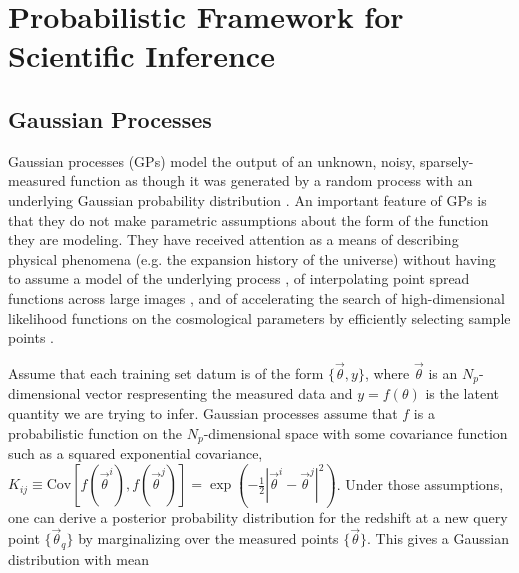 \documentclass[useAMS,usenatbib,tightenlines,11pt,preprint]{aastex}
\begin{document}


\section{Probabilistic Framework for Scientific Inference}

\subsection{Gaussian Processes}
\label{sec:gppz}

Gaussian processes (GPs) model the output of an unknown, noisy,
sparsely-measured
function as though it was generated by a random process with an underlying
Gaussian probability distribution \cite{gp}.
An important feature of GPs is that they do not make parametric assumptions
about the form of the function they are modeling.  They have received
attention as a means of describing physical phenomena (e.g. the expansion
history of the universe) without having to assume a model of the underlying
process \cite{ericgp}, of interpolating point spread functions across large
images \cite{psf}, and of accelerating the search of high-dimensional
likelihood functions on the cosmological parameters by efficiently
selecting sample points \cite{daniel2012}.  

Assume that each training set datum is of the form
$\{\vec{\theta},y\}$, where $\vec{\theta}$ is an $N_p$-dimensional vector
respresenting the measured data and $y = f(\theta)$ is
the latent quantity we are trying to infer.  Gaussian
processes assume that $f$ is a probabilistic function on the
$N_p$-dimensional space with some covariance function such as a squared
exponential covariance,
$K_{ij}\equiv\text{Cov}\left[f(\vec{\theta}^{i}),f(\vec{\theta}^{j})\right]
= \exp(-\frac{1}{2}|\vec{\theta}^{i} - \vec{\theta}^{j}|^2)$.
Under those assumptions, one can derive a posterior probability distribution
for the redshift at a new query point $\{\vec{\theta}_{q}\}$ by marginalizing
over the measured points $\{\vec{\theta}\}$.  
This gives a Gaussian distribution with mean 
\end{document}
